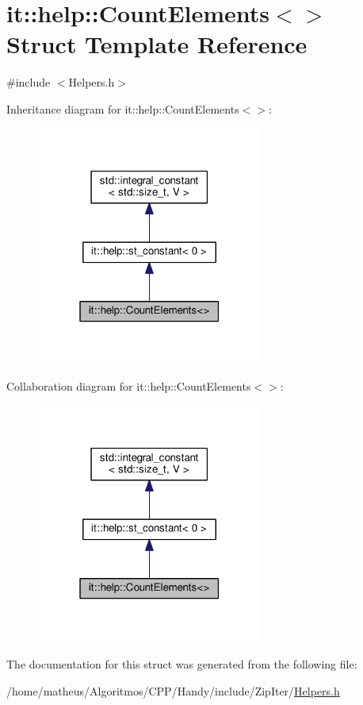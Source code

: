 \hypertarget{structit_1_1help_1_1CountElements_3_4}{}\section{it\+:\+:help\+:\+:Count\+Elements$<$$>$ Struct Template Reference}
\label{structit_1_1help_1_1CountElements_3_4}


{\ttfamily \#include $<$Helpers.\+h$>$}



Inheritance diagram for it\+:\+:help\+:\+:Count\+Elements$<$$>$\+:\nopagebreak
\begin{figure}[H]
\begin{center}
\leavevmode
\includegraphics[width=211pt]{structit_1_1help_1_1CountElements_3_4__inherit__graph}
\end{center}
\end{figure}


Collaboration diagram for it\+:\+:help\+:\+:Count\+Elements$<$$>$\+:\nopagebreak
\begin{figure}[H]
\begin{center}
\leavevmode
\includegraphics[width=211pt]{structit_1_1help_1_1CountElements_3_4__coll__graph}
\end{center}
\end{figure}


The documentation for this struct was generated from the following file\+:\begin{DoxyCompactItemize}
\item 
/home/matheus/\+Algoritmos/\+C\+P\+P/\+Handy/include/\+Zip\+Iter/\hyperlink{ZipIter_2Helpers_8h}{Helpers.\+h}\end{DoxyCompactItemize}
